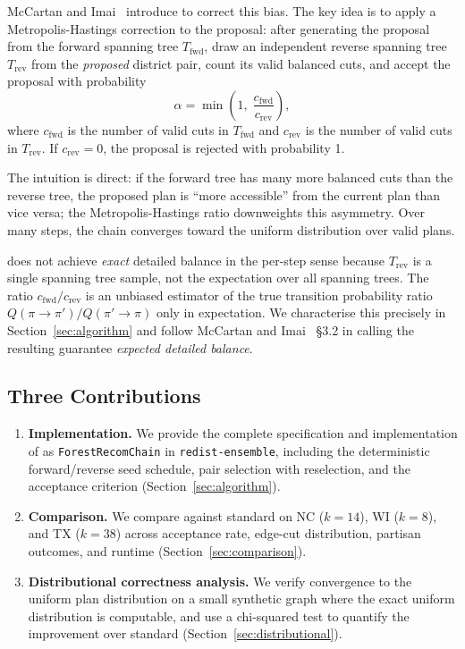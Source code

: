 McCartan and Imai~\citep{mccartan2020} introduce \fr{} to correct this bias.
The key idea is to apply a Metropolis-Hastings correction to the \recom{}
proposal: after generating the proposal from the forward spanning tree
$T_{\mathrm{fwd}}$, draw an independent reverse spanning tree $T_{\mathrm{rev}}$
from the \emph{proposed} district pair, count its valid balanced cuts, and
accept the proposal with probability
\[
  \alpha = \min\!\left(1,\; \frac{c_{\mathrm{fwd}}}{c_{\mathrm{rev}}}\right),
\]
where $c_{\mathrm{fwd}}$ is the number of valid cuts in $T_{\mathrm{fwd}}$
and $c_{\mathrm{rev}}$ is the number of valid cuts in $T_{\mathrm{rev}}$.
If $c_{\mathrm{rev}} = 0$, the proposal is rejected with probability 1.

The intuition is direct: if the forward tree has many more balanced cuts than
the reverse tree, the proposed plan is ``more accessible'' from the current
plan than vice versa; the Metropolis-Hastings ratio downweights this
asymmetry.
Over many steps, the chain converges toward the uniform distribution over valid
plans.

\fr{} does not achieve \emph{exact} detailed balance in the per-step sense
because $T_{\mathrm{rev}}$ is a single spanning tree sample, not the
expectation over all spanning trees.
The ratio $c_{\mathrm{fwd}} / c_{\mathrm{rev}}$ is an unbiased estimator of
the true transition probability ratio $Q(\pi \to \pi') / Q(\pi' \to \pi)$
only in expectation.
We characterise this precisely in Section~\ref{sec:algorithm} and follow
McCartan and Imai~\citep{mccartan2020} §3.2 in calling the resulting guarantee
\emph{expected detailed balance}.

\subsection{Three Contributions}

\begin{enumerate}
  \item \textbf{Implementation.}
        We provide the complete specification and implementation of \fr{} as
        \texttt{ForestRecomChain} in \texttt{redist-ensemble}, including the
        deterministic forward/reverse seed schedule, pair selection with
        reselection, and the acceptance criterion
        (Section~\ref{sec:algorithm}).

  \item \textbf{Comparison.}
        We compare \fr{} against standard \recom{} on NC ($k = 14$), WI
        ($k = 8$), and TX ($k = 38$) across acceptance rate, edge-cut
        distribution, partisan outcomes, and runtime
        (Section~\ref{sec:comparison}).

  \item \textbf{Distributional correctness analysis.}
        We verify convergence to the uniform plan distribution on a small
        synthetic graph where the exact uniform distribution is computable,
        and use a chi-squared test to quantify the improvement over standard
        \recom{} (Section~\ref{sec:distributional}).
\end{enumerate}

